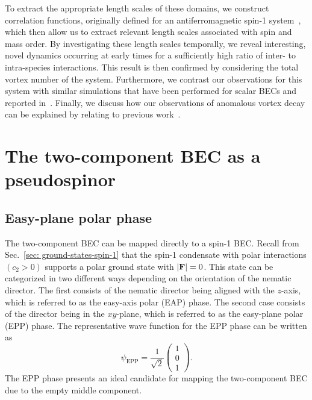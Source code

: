 To extract the appropriate length scales of these domains, we construct
correlation functions, originally defined for an antiferromagnetic spin-1
system~\cite{Symes2017}, which then allow us to extract relevant length scales
associated with spin and mass order.
By investigating these length scales temporally, we reveal interesting,
novel dynamics occurring at early times for a sufficiently high ratio of
inter- to intra-species interactions.
This result is then confirmed by considering the total vortex number of the
system.
Furthermore, we contrast our observations for this system with similar
simulations that have been performed for scalar BECs and reported
in~\cite{Schole2012, Nowak2012, Karl2017}.
Finally, we discuss how our observations of anomalous vortex decay can be
explained by relating to previous work~\cite{Eto2011, Kasamatsu2016}.


\section{The two-component BEC as a pseudospinor}

\subsection{Easy-plane polar phase}\label{subsec:easy-plane-polar-phase}
The two-component BEC can be mapped directly to a spin-1 BEC\@.
Recall from Sec.~\ref{sec: ground-states-spin-1} that the spin-1 condensate
with polar interactions \((c_2 > 0)\) supports a polar ground state with
\(|\vb{F}|=0\).
This state can be categorized in two different ways depending on the orientation
of the nematic director.
The first consists of the nematic director being aligned with the \( z \)-axis,
which is referred to as the easy-axis polar (EAP) phase.
The second case consists of the director being in the \( xy \)-plane, which is
referred to as the easy-plane polar (EPP) phase.
The representative wave function for the EPP phase can be written as
\begin{equation}
    \psi_\mathrm{EPP} = \frac{1}{\sqrt{2}}\begin{pmatrix}
        1 \\ 0 \\ 1
    \end{pmatrix}.
    \label{eq:EPP_wavefunction}
\end{equation}
The EPP phase presents an ideal candidate for mapping the two-component BEC
due to the empty middle component.

